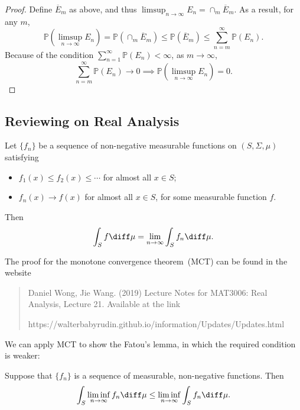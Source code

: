 \begin{proof}
Define $\overline{E}_m$ as above, and thus $\limsup_{n\to\infty}E_n=\cap_m\overline{E}_m$.
As a result, for any $m$,
\[
\mathbb{P}\left(\limsup_{n\to\infty} E_n\right)
=
\mathbb{P}(\cap_m\overline{E}_m)\le \mathbb{P}(\overline{E}_m)\le\sum_{n=m}^\infty\mathbb{P}(E_n).
\]
%
%
%
%
Because of the condition $\sum_{n=1}^\infty\mathbb{P}(E_n)<\infty$, as $m\to\infty$,
\[
\sum_{n=m}^\infty\mathbb{P}(E_n)\to0\implies
\mathbb{P}\left(\limsup_{n\to\infty} E_n\right)=0.
\]
\end{proof}

\subsection{Reviewing on Real Analysis}

\begin{theorem}
Let $\{f_n\}$ be a sequence of non-negative measurable functions on $(S,\Sigma,\mu)$ satisfying
\begin{itemize}
\item
$f_1(x)\le f_2(x)\le\cdots$ for almost all $x\in S$;
\item
$f_n(x)\to f(x)$ for almost all $x\in S$, for some measurable function $f$.
\end{itemize}
Then 
\[
\int_Sf\diff\mu = \lim_{n\to\infty}\int_Sf_n\diff\mu.
\]
\end{theorem}
The proof for the monotone convergence theorem~(MCT) can be found in the website
\begin{quotation}
Daniel Wong, Jie Wang. (2019) Lecture Notes
for MAT3006: Real Analysis, Lecture 21. Available at
the link 

https://walterbabyrudin.github.io/information/Updates/Updates.html
\end{quotation}
We can apply MCT to show the Fatou's lemma, in which the required condition is weaker:
\begin{theorem}
Suppose that $\{f_n\}$ is a sequence of measurable, non-negative functions. Then
\[
\int_S \liminf_{n\to\infty}f_n\diff\mu
\le
\liminf_{n\to\infty}\int_S f_n\diff\mu.
\]
\end{theorem}

